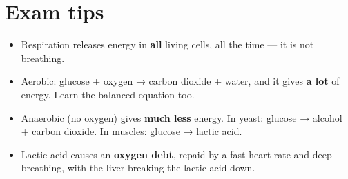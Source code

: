 \documentclass[11pt]{article}
\begin{document}
\section*{Exam tips}

\begin{itemize}
\item Respiration releases energy in \textbf{all} living cells, all the time — it is not breathing.

\item Aerobic: glucose + oxygen → carbon dioxide + water, and it gives \textbf{a lot} of energy. Learn the balanced equation too.

\item Anaerobic (no oxygen) gives \textbf{much less} energy. In yeast: glucose → alcohol + carbon dioxide. In muscles: glucose → lactic acid.

\item Lactic acid causes an \textbf{oxygen debt}, repaid by a fast heart rate and deep breathing, with the liver breaking the lactic acid down.

\end{itemize}
\end{document}
